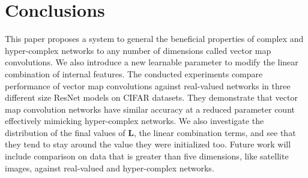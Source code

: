 \documentclass[14pt,a4paper]{article}
\begin{document}
\section{Conclusions}
This paper proposes a system to general the beneficial properties of complex and hyper-complex networks to any number of dimensions called vector map convolutions.
We also introduce a new learnable parameter to modify the linear combination of internal features.
The conducted experiments compare performance of vector map convolutions against real-valued networks in three different size ResNet models on CIFAR datasets.
They demonstrate that vector map convolution networks have similar accuracy at a reduced parameter count effectively mimicking hyper-complex networks.
We also investigate the distribution of the final values of $\textbf{L}$, the linear combination terms, and see that they tend to stay around the value they were initialized too.
Future work will include comparison on data that is greater than five dimensions, like satellite images, against real-valued and hyper-complex networks.


\clearpage
%


\end{document}
